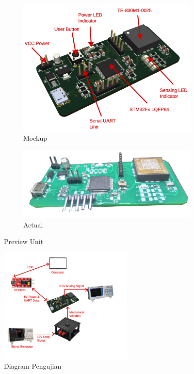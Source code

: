 \documentclass{book} %
\begin{document}
	\begin{figure}[h]
		\centering
		\begin{subfigure}{0.3\textwidth}
			\includegraphics[width=\textwidth]{images/vibparts.png}
			\caption{Mockup}
		\end{subfigure}
		\begin{subfigure}{0.3\textwidth}
			\includegraphics[width=\textwidth]{images/vibs.png}
			\caption{Actual}
		\end{subfigure}
		\caption{Preview Unit}
	\end{figure}
	
	\begin{figure}[!ht]
		\centering
		\includegraphics[width=0.6\textwidth]{images/testing}
		\caption{Diagram Pengujian}
	\end{figure}
	
\end{document}
